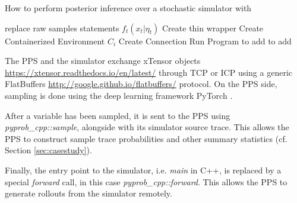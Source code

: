 \documentclass{article}
\begin{document}
 \label{sec:methods}

  \begin{algorithm}
   \caption{How to perform posterior inference over a stochastic simulator with 
   }
    \begin{algorithmic}[1]
      \Comment{}

        \State replace raw samples statements $f_{t}(x_{t} | \eta_{t}) $
        \State Create thin wrapper
        \State Create Containerized Environment $C_{i}$
        \State Create Connection
        \State Run Program
       \EndFunction
       \State to add
       \EndFunction
       \State to add
       \EndFunction


\end{algorithmic}
\end{algorithm}





The PPS and the simulator exchange xTensor objects \url{https://xtensor.readthedocs.io/en/latest/} through TCP or ICP using a generic FlatBuffers \url{http://google.github.io/flatbuffers/} protocol. On the PPS side, sampling is done using the deep learning framework PyTorch \cite{paszke2017automatic}.

After a variable has been sampled, it is sent to the PPS using \textit{pyprob\_cpp::sample}, alongside with its simulator source trace. This allows the PPS to construct sample trace probabilities and other summary statistics (cf. Section \ref{sec:casestudy}). 

Finally, the entry point to the simulator, i.e. \textit{main} in C++, is replaced by a special \textit{forward} call, in this case \textit{pyprob\_cpp::forward}.
This allows the PPS to generate rollouts from the simulator remotely. 
\end{document}
